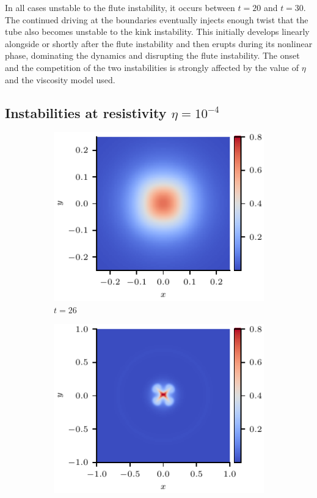 \documentclass[fleqn,usenatbib]{mnras}
\begin{document}
In all cases unstable to the flute instability, it occurs  between $t=20$ and
$t=30$. The continued driving at the boundaries eventually injects enough twist
that the tube also becomes unstable to the kink instability. This initially
develops linearly alongside or shortly after the flute instability and then
erupts during its nonlinear phase, dominating the dynamics and disrupting
the   flute instability. The onset and the competition of the two instabilities
is strongly affected by the value of $\eta$ and the viscosity model used. 

\subsection{Instabilities at resistivity $\eta=10^{-4}$}

\begin{figure}
  \centering
    \begin{subfigure}{0.32\textwidth}
      \includegraphics[width=\linewidth]{swi-4_pressure_13.pdf}
      \caption{$t=26$}
      \label{fig:swi-4_pressure_13}
    \end{subfigure}
    \hfill
    \begin{subfigure}{0.32\textwidth}
      \includegraphics[width=\linewidth]{swi-4_pressure_14.pdf}

\end{subfigure}
\end{figure}
\end{document}
